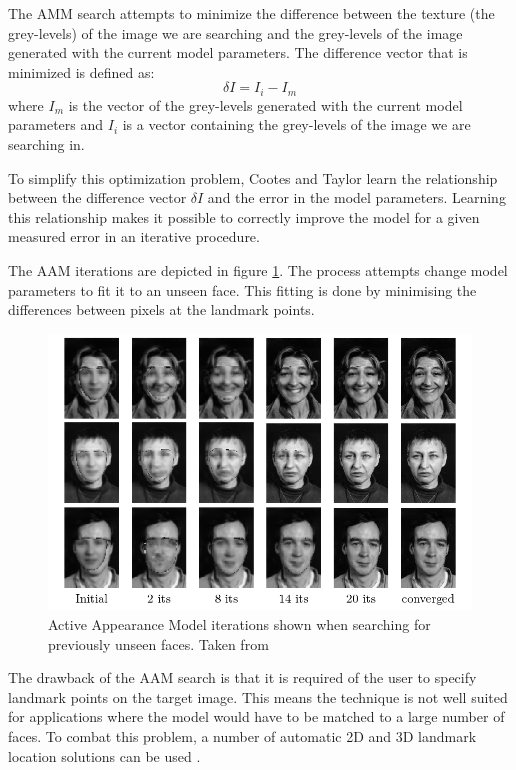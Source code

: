 \documentclass[11pt,a4paper]{report}
\begin{document}
The AMM search attempts to minimize the difference between the texture (the
grey-levels) of the image we are searching and the grey-levels of the
image generated with the current model parameters. The difference vector that is
minimized is defined as:
\begin{equation}
\delta I = I_i - I_m
\end{equation}
where $I_m$ is the vector of the grey-levels generated with the current model
parameters and $I_i$ is a vector containing the grey-levels of the image we are
searching in.

To simplify this optimization problem, Cootes and Taylor learn the relationship
between the difference vector $\delta I$ and the error in the model
parameters. Learning this relationship makes it possible to correctly improve the
model for a given measured error in an iterative procedure.

The AAM iterations are depicted in figure \ref{gr:amm}. The process attempts
change model parameters to fit it to an unseen face. This fitting is done by
minimising the differences between pixels at the landmark points.

\begin{figure}[H]

\includegraphics[scale=0.8]{images/amm_example.png}
\caption{ Active Appearance Model iterations shown when searching for previously
 unseen faces. Taken from \cite{activeApp04} }
\label{gr:amm}
\end{figure}

The drawback of the AAM search is that it is required of the user to specify
landmark points on the target image. This means the technique is not well suited
for applications where the model would have to be matched to a large number of
faces. To combat this problem, a number of automatic 2D and 3D landmark location
solutions can be used \cite{activeApp04}.
\end{document}
